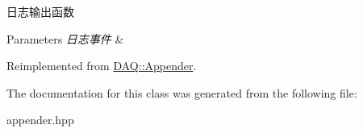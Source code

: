 日志输出函数 


\begin{DoxyParams}{Parameters}
{\em 日志事件} & \\
\hline
\end{DoxyParams}


Reimplemented from \hyperlink{classDAQ_1_1Appender_a49ebbcec4d879ba461080479fa1085aa}{D\+A\+Q\+::\+Appender}.



The documentation for this class was generated from the following file\+:\begin{DoxyCompactItemize}
\item 
appender.\+hpp\end{DoxyCompactItemize}
